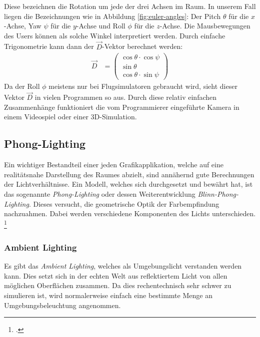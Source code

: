\documentclass[titlepage, 11pt, a4paper, ngerman]{article}
\begin{document}
Diese bezeichnen die Rotation um jede der drei Achsen im Raum. In unserem Fall liegen die Bezeichnungen wie in Abbildung \ref{fig:euler-angles}: Der Pitch $\theta$ für die $x$-Achse, Yaw $\psi$ für die $y$-Achse und Roll $\phi$ für die $z$-Achse. Die Mausbewegungen des Users können als solche Winkel interpretiert werden. Durch einfache Trigonometrie kann dann der $\vec{D}$-Vektor berechnet werden:
\begin{align*}
    \vec{D} &= \begin{pmatrix}
    \cos{\theta} \cdot \cos{\psi} \\
    \sin{\theta} \\
    \cos{\theta} \cdot \sin{\psi}
    \end{pmatrix}
\end{align*}
\bigbreak
Da der Roll $\phi$ meistens nur bei Flugsimulatoren gebraucht wird, sieht dieser Vektor $\vec{D}$ in vielen Programmen so aus. Durch diese relativ einfachen Zusammenhänge funktioniert die vom Programmierer eingeführte Kamera in einem Videospiel oder einer 3D-Simulation.

\subsection{Phong-Lighting}
Ein wichtiger Bestandteil einer jeden Grafikapplikation, welche auf eine realitätsnahe Darstellung des Raumes abzielt, sind annähernd gute Berechnungen der Lichtverhältnisse. Ein Modell, welches sich durchgesetzt und bewährt hat, ist das sogenannte \textit{Phong-Lighting} oder dessen Weiterentwicklung \textit{Blinn-Phong-Lighting}. Dieses versucht, die geometrische Optik der Farbempfindung nachzuahmen. Dabei werden verschiedene Komponenten des Lichts unterschieden. \footcite{logl-lighting}

\subsubsection{Ambient Lighting}
Es gibt das \textit{Ambient Lighting}, welches als Umgebungslicht verstanden werden kann. Dies setzt sich in der echten Welt aus reflektiertem Licht von allen möglichen Oberflächen zusammen. Da dies rechentechnisch sehr schwer zu simulieren ist, wird normalerweise einfach eine bestimmte Menge an Umgebungsbeleuchtung angenommen.
\end{document}
